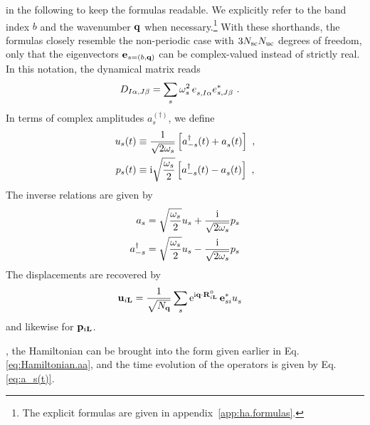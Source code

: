  in the following to keep the formulas readable. We explicitly refer to the band index $b$ and the wavenumber ${\bf q}$ when necessary.\footnote{The explicit formulas are given in appendix~\ref{app:ha.formulas}.}
With these shorthands, the formulas closely resemble the non-periodic case with $3N_{\rm sc} N_{\rm uc}$ degrees of freedom, only that the eigenvectors ${\bf e}_{s = (b, {\bf q})}$ can be complex-valued instead of strictly real. In this notation, the dynamical matrix reads
\begin{align}
D_{I \alpha, J \beta}
&= \sum_s \omega^{2}_{s \vphantom I} \, \fD e_{s, I \alpha} e^\ast_{s, J \beta}~.
\end{align}
In terms of complex amplitudes $a^{(\dagger)}_s$, we define
\begin{subequations}
	\label{eq:u_s.amplitudes.periodic}
\begin{align}
	u_s (t) 
		&\equiv \frac{1}{\sqrt{2 \omega_{s}}} \left[ \D a_{-s} (t) + \fD a_s (t) \right]~, \\
	p_s (t) 
		&\equiv \im \sqrt{\frac{\omega_s}{2}} \left[ \D a_{-s} (t) - \fD a_s (t) \right]~,
\end{align}
\end{subequations}
The inverse relations are given by
\begin{subequations}
	\label{eq:a(q)}
	\begin{align}
	a_s
		&= \sqrt{\frac{\omega_s}{2}} u_s + \frac{{\rm i}}{\sqrt{2 \omega_s}} p_s \\
	a^\dagger_{-s}
		&= \sqrt{\frac{\omega_s}{2}} u_s - \frac{{\rm i}}{\sqrt{2 \omega_s}} p_s
	\end{align}
\end{subequations}
The displacements are recovered by
\begin{align}
    \b u_{i \b L}
	    &= \frac{1}{\sqrt{N_{\b q}}} \sum_{s} {\rm e}^{\im  \b q \cdot \b R^0_{i \b L}} \, \b e^\ast_{s i} \fD u_s
    \label{eq:u_iL}
\end{align}
and likewise for ${\bf p}_{i {\bf L}}$.

, the Hamiltonian can be brought into the form given earlier in Eq.\,\eqref{eq:Hamiltonian.aa}, and the time evolution of the operators is given by Eq.\,\eqref{eq:a_s(t)}.

